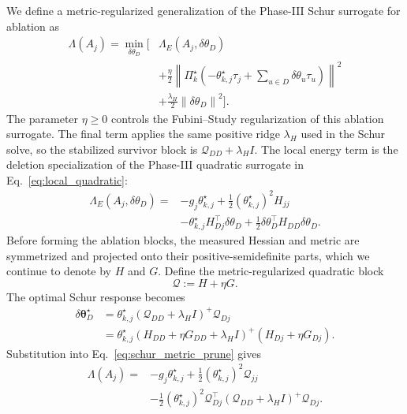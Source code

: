 \documentclass[
  reprint,
  amsmath,
  amssymb,
  aps,
  pra,
  nofootinbib,
  superscriptaddress,
  floatfix
]{revtex4-2}
\begin{document}
We define a metric-regularized generalization of the Phase-III Schur surrogate
for ablation as
\begin{equation}
\begin{aligned}
\Lambda(A_j)
=
\min_{\delta\theta_D}
\Biggl[
&\Lambda_E(A_j,\delta\theta_D)
\\
&+
\frac{\eta}{2}
\left\|
\Pi_k^\star
\left(
-\theta_{k,j}^\star\tau_j
+
\sum_{u\in D}\delta\theta_u\tau_u
\right)
\right\|^2
\\
&+
\frac{\lambda_H}{2}
\left\|\delta\theta_D\right\|^2
\Biggr].
\end{aligned}
\label{eq:schur_metric_prune}
\end{equation}
The parameter \(\eta\ge0\) controls the Fubini--Study regularization of this
ablation surrogate.
The final term applies the same positive ridge \(\lambda_H\) used in the Schur
solve, so the stabilized survivor block is \(\mathcal Q_{DD}+\lambda_HI\).
The local energy term is the deletion specialization of the Phase-III
quadratic surrogate in Eq.~\eqref{eq:local_quadratic}:
\begin{equation*}
\begin{aligned}
\Lambda_E(A_j,\delta\theta_D)
={}&
-g_j\theta_{k,j}^\star
+
\frac12(\theta_{k,j}^\star)^2H_{jj}
\\
&-
\theta_{k,j}^\star H_{Dj}^{\top}\delta\theta_D
+
\frac12\delta\theta_D^{\top}H_{DD}\delta\theta_D .
\end{aligned}
\end{equation*}
Before forming the ablation blocks, the measured Hessian and metric are
symmetrized and projected onto their positive-semidefinite parts, which we
continue to denote by \(H\) and \(G\). Define the metric-regularized quadratic
block
\[
\mathcal Q:=H+\eta G .
\]
The optimal Schur response becomes
\begin{equation*}
\begin{aligned}
\delta\boldsymbol\theta_D^\star
&=
\theta_{k,j}^\star
(\mathcal Q_{DD}+\lambda_HI)^{+}\mathcal Q_{Dj}
\\
&=
\theta_{k,j}^\star
\left(H_{DD}+\eta G_{DD}+\lambda_HI\right)^+
\left(H_{Dj}+\eta G_{Dj}\right).
\end{aligned}
\end{equation*}
Substitution into Eq.~\eqref{eq:schur_metric_prune} gives
\begin{equation*}
\begin{aligned}
\Lambda(A_j)
={}&
-g_j\theta_{k,j}^\star
+
\frac12(\theta_{k,j}^\star)^2\mathcal Q_{jj}
\\
&-
\frac12(\theta_{k,j}^\star)^2
\mathcal Q_{Dj}^{\top}
(\mathcal Q_{DD}+\lambda_HI)^{+}
\mathcal Q_{Dj}.
\end{aligned}
\end{equation*}
\end{document}
